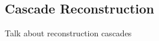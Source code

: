 \subsection{Cascade Reconstruction}
\label{CascadeReconstruction}

Talk about reconstruction cascades